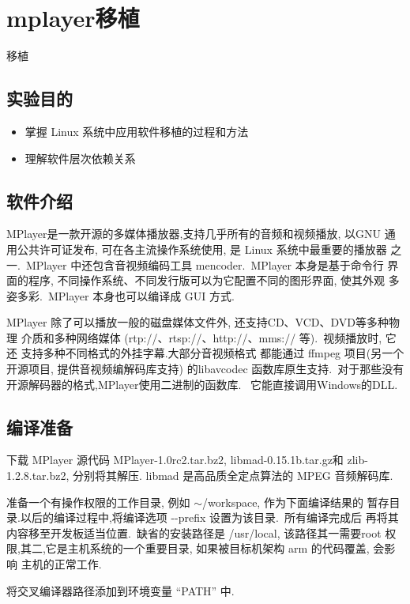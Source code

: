 \chapter{mplayer移植}{移植}

\section{实验目的}
\begin{itemize}\itemsep=-3pt
  \item 掌握 Linux 系统中应用软件移植的过程和方法
  \item 理解软件层次依赖关系
\end{itemize}

\section{软件介绍}

	MPlayer是一款开源的多媒体播放器,支持几乎所有的音频和视频播放, 以GNU
通用公共许可证发布, 可在各主流操作系统使用, 是 Linux 系统中最重要的播放器
之一.~MPlayer 中还包含音视频编码工具 mencoder.~MPlayer 本身是基于命令行
界面的程序, 不同操作系统、不同发行版可以为它配置不同的图形界面, 使其外观
多姿多彩.~MPlayer 本身也可以编译成 GUI 方式.

	MPlayer 除了可以播放一般的磁盘媒体文件外, 还支持CD、VCD、DVD等多种物理
介质和多种网络媒体 (rtp://、rtsp://、http://、mms:// 等).~视频播放时, 它还
支持多种不同格式的外挂字幕.大部分音视频格式
都能通过 ffmpeg 项目(另一个开源项目, 提供音视频编解码库支持) 的libavcodec
函数库原生支持.~对于那些没有开源解码器的格式,MPlayer使用二进制的函数库.
~它能直接调用Windows的DLL.

\section{编译准备}

	下载 MPlayer 源代码 MPlayer-1.0rc2.tar.bz2, libmad-0.15.1b.tar.gz和
 zlib-1.2.8.tar.bz2, 分别将其解压.
 libmad 是高品质全定点算法的 MPEG 音频解码库.

	准备一个有操作权限的工作目录, 例如 $\sim$/workspace, 作为下面编译结果的
暂存目录.以后的编译过程中,将编译选项 -{}-prefix 设置为该目录.~所有编译完成后
再将其内容移至开发板适当位置.~缺省的安装路径是 /usr/local, 该路径其一需要root
权限,其二,它是主机系统的一个重要目录, 如果被目标机架构 arm 的代码覆盖, 会影响
主机的正常工作.

	将交叉编译器路径添加到环境变量 ``PATH'' 中.

